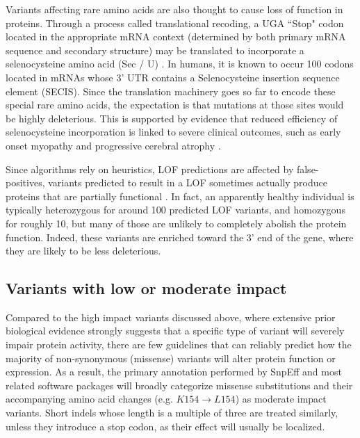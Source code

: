 Variants affecting rare amino acids are also thought to cause loss of function in proteins. 
Through a process called translational recoding, a UGA ``Stop" codon located in the appropriate mRNA context (determined by both primary mRNA sequence and secondary structure) may be translated to incorporate a selenocysteine amino acid (Sec / U) \cite{alberts1995molecular}. 
In humans, it is known to occur 100 codons located in mRNAs whose 3' UTR contains a Selenocysteine insertion sequence element (SECIS). 
Since the translation machinery goes so far to encode these special rare amino acids, the expectation is that mutations at those sites would be highly deleterious. 
This is supported by evidence that reduced efficiency of selenocysteine incorporation is linked to severe clinical outcomes, such as early onset myopathy  \cite{maiti2009mutation} and progressive cerebral atrophy  \cite{agamy2010mutations}.
	
Since algorithms rely on heuristics, LOF predictions are affected by false-positives, variants predicted to result in a LOF sometimes actually produce proteins that are partially functional  \cite{macarthur2012systematic}. 
In fact, an apparently healthy individual is typically heterozygous for around 100 predicted LOF variants, and homozygous for roughly 10, but many of those are unlikely to completely abolish the protein function. 
Indeed, these variants are enriched toward the 3' end of the gene, where they are likely to be less deleterious. 

\subsection{Variants with low or moderate impact}

Compared to the high impact variants discussed above, where extensive prior biological evidence strongly suggests that a specific type of variant will severely impair protein activity, there are few guidelines that can reliably predict how the majority of non-synonymous (missense) variants will alter protein function or expression. As a result, the primary annotation performed by SnpEff and most related software packages will broadly categorize missense substitutions and their accompanying amino acid changes (e.g. $K154 \rightarrow L154$) as moderate impact variants. Short indels whose length is a multiple of three are treated similarly, unless they introduce a stop codon, as their effect will usually be localized.

